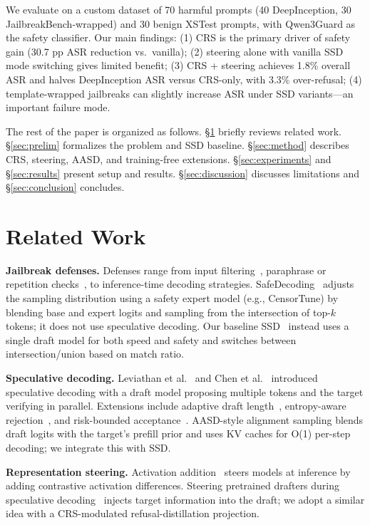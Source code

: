 \documentclass[11pt,a4paper]{article}
\begin{document}
We evaluate on a custom dataset of 70 harmful prompts (40 DeepInception, 30 JailbreakBench-wrapped) and 30 benign XSTest prompts, with Qwen3Guard as the safety classifier. Our main findings: (1) CRS is the primary driver of safety gain (30.7 pp ASR reduction vs.\ vanilla); (2) steering alone with vanilla SSD mode switching gives limited benefit; (3) CRS + steering achieves 1.8\% overall ASR and halves DeepInception ASR versus CRS-only, with 3.3\% over-refusal; (4) template-wrapped jailbreaks can slightly increase ASR under SSD variants—an important failure mode.

The rest of the paper is organized as follows. \S\ref{sec:related} briefly reviews related work. \S\ref{sec:prelim} formalizes the problem and SSD baseline. \S\ref{sec:method} describes CRS, steering, AASD, and training-free extensions. \S\ref{sec:experiments} and \S\ref{sec:results} present setup and results. \S\ref{sec:discussion} discusses limitations and \S\ref{sec:conclusion} concludes.

\section{Related Work}
\label{sec:related}

\textbf{Jailbreak defenses.} Defenses range from input filtering~\cite{smoothllm}, paraphrase or repetition checks~\cite{parden}, to inference-time decoding strategies. SafeDecoding~\cite{safedecoding} adjusts the sampling distribution using a safety expert model (e.g., CensorTune) by blending base and expert logits and sampling from the intersection of top-$k$ tokens; it does not use speculative decoding. Our baseline SSD~\cite{ssd2025} instead uses a single draft model for both speed and safety and switches between intersection/union based on match ratio.

\textbf{Speculative decoding.} Leviathan et al.~\cite{leviathan2023} and Chen et al.~\cite{specdecode} introduced speculative decoding with a draft model proposing multiple tokens and the target verifying in parallel. Extensions include adaptive draft length~\cite{adaedl,adasd}, entropy-aware rejection~\cite{easd}, and risk-bounded acceptance~\cite{arcdecode}. AASD-style alignment sampling blends draft logits with the target's prefill prior and uses KV caches for O(1) per-step decoding; we integrate this with SSD.

\textbf{Representation steering.} Activation addition~\cite{actadd} steers models at inference by adding contrastive activation differences. Steering pretrained drafters during speculative decoding~\cite{steeringdraft} injects target information into the draft; we adopt a similar idea with a CRS-modulated refusal-distillation projection.
\end{document}

